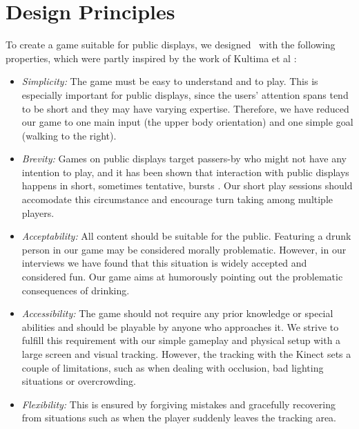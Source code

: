 \documentclass{chi-ext}
\begin{document}
%

\section{Design Principles}
%
To create a game suitable for public displays, we designed \drunkened\ with the following properties, which were partly inspired by the work of Kultima et al \cite{kultima2009casual}:
\begin{itemize}\compresslist
\item \textit{Simplicity:} The game must be easy to understand and to play. This is especially important for public displays, since the users' attention spans tend to be short and they may have varying expertise. Therefore, we have reduced our game to one main input (the upper body orientation) and one simple goal (walking to the right).
\item \textit{Brevity:} Games on public displays target passers-by who might not have any intention to play, and it has been shown that interaction with public displays happens in short, sometimes tentative, bursts \cite{walter2013strikeapose}. Our short play sessions should accomodate this circumstance and encourage turn taking among multiple players.
\item \textit{Acceptability:} All content should be suitable for the public. Featuring a drunk person in our game may be considered morally problematic. However, in our interviews we have found that this situation is widely accepted and considered fun. Our game aims at humorously pointing out the problematic consequences of drinking.
\item \textit{Accessibility:} The game should not require any prior knowledge or special abilities and should be playable by anyone who approaches it. We strive to fulfill this requirement with our  simple gameplay and physical setup with a large screen and visual tracking. However, the tracking with the Kinect sets a couple of limitations, such as when dealing with occlusion, bad lighting situations or overcrowding.
\item \textit{Flexibility:} This is ensured by forgiving mistakes and gracefully recovering from situations such as when the player suddenly leaves the tracking area.
\end{itemize}
\end{document}

